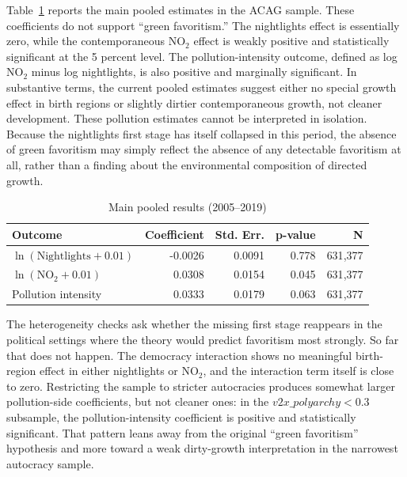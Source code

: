 \documentclass[11pt]{article}
\begin{document}
Table~\ref{tab:main-results} reports the main pooled estimates in the ACAG sample. These coefficients do not support ``green favoritism.'' The nightlights effect is essentially zero, while the contemporaneous NO$_2$ effect is weakly positive and statistically significant at the 5 percent level. The pollution-intensity outcome, defined as log NO$_2$ minus log nightlights, is also positive and marginally significant. In substantive terms, the current pooled estimates suggest either no special growth effect in birth regions or slightly dirtier contemporaneous growth, not cleaner development. These pollution estimates cannot be interpreted in isolation. Because the nightlights first stage has itself collapsed in this period, the absence of green favoritism may simply reflect the absence of any detectable favoritism at all, rather than a finding about the environmental composition of directed growth.

\begin{table}[h]
\centering
\caption{Main pooled results (2005--2019)}
\label{tab:main-results}
\small
\begin{tabular}{lrrrr}
\toprule
Outcome & Coefficient & Std. Err. & p-value & N \\
\midrule
$\ln(\text{Nightlights}+0.01)$ & -0.0026 & 0.0091 & 0.778 & 631{,}377 \\
$\ln(\text{NO}_2+0.01)$ & 0.0308 & 0.0154 & 0.045 & 631{,}377 \\
Pollution intensity & 0.0333 & 0.0179 & 0.063 & 631{,}377 \\
\bottomrule
\end{tabular}
\end{table}

The heterogeneity checks ask whether the missing first stage reappears in the political settings where the theory would predict favoritism most strongly. So far that does not happen. The democracy interaction shows no meaningful birth-region effect in either nightlights or NO$_2$, and the interaction term itself is close to zero. Restricting the sample to stricter autocracies produces somewhat larger pollution-side coefficients, but not cleaner ones: in the $v2x\_polyarchy < 0.3$ subsample, the pollution-intensity coefficient is positive and statistically significant. That pattern leans away from the original ``green favoritism'' hypothesis and more toward a weak dirty-growth interpretation in the narrowest autocracy sample.
\end{document}
